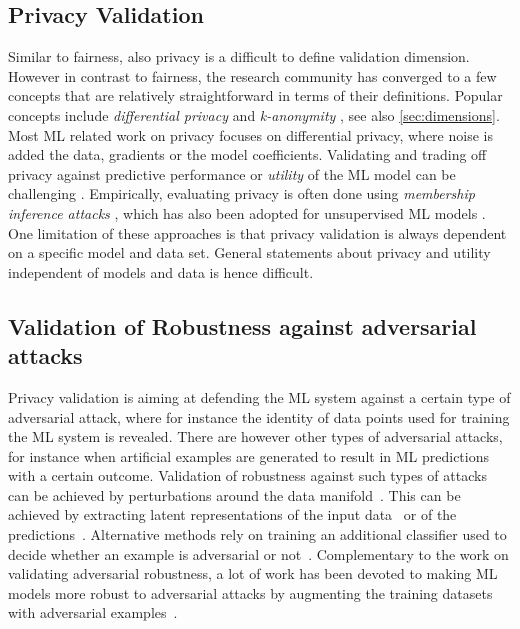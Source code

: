 \subsection{Privacy Validation}
Similar to fairness, also privacy is a difficult to define validation dimension. However in contrast to fairness, the research community has converged to a few concepts that are relatively straightforward in terms of their definitions. Popular concepts include {\em differential privacy} \cite{Dworak_2006_diff} and {\em k-anonymity} \cite{Sweeney2002}, see also \autoref{sec:dimensions}.
Most ML related work on privacy focuses on differential privacy, where noise is added the data, gradients or the model coefficients. Validating and trading off privacy against predictive performance or {\em utility} of the ML model can be challenging \cite{Jayaraman2019}.
Empirically, evaluating privacy is often done using {\em membership inference attacks} \cite{Shokri2017}, which has also been adopted for unsupervised ML models \cite{Hayes2019}. One limitation of these approaches is that privacy validation is always dependent on a specific model and data set. General statements about privacy and utility independent of models and data is hence difficult.

\subsection{Validation of Robustness against adversarial attacks}

Privacy validation is aiming at defending the ML system against a certain type of adversarial attack, where for instance the identity of data points used for training the ML system is revealed. There are however other types of adversarial attacks, for instance when artificial examples are generated to result in ML predictions with a certain outcome. Validation of robustness against such types of attacks can be achieved by perturbations around the data manifold~\cite{pang2017robust, aleks2017deep}. This can be achieved by extracting latent representations of the input data~\cite{hendrycks2016early} or of the predictions~\cite{Bhagoji_2018, feinman2017detecting}. Alternative methods rely on training an additional classifier used to decide whether an example is adversarial or not~\cite{gong2017adversarial, grosse2017statistical, metzen2017detecting}. Complementary to the work on validating adversarial robustness, a lot of work has been devoted to making ML models more robust to adversarial attacks by augmenting the training datasets with adversarial examples~\cite{goodfellow2014explaining,aleks2017deep, zhang2019, Dingyuan2019}.


